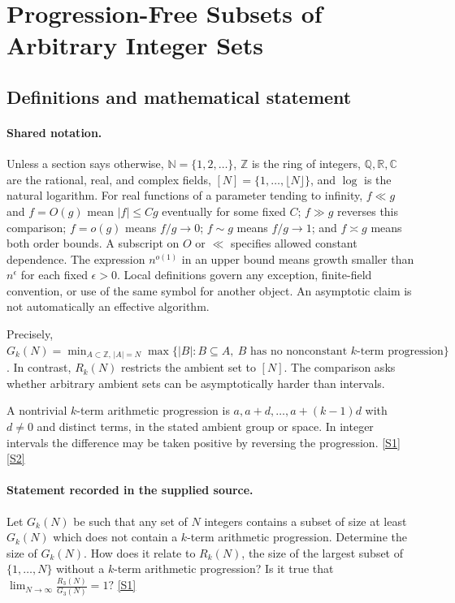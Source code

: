 \documentclass[11pt,a4paper]{article}
\newcommand{\N}{\mathbb{N}}
\newcommand{\Z}{\mathbb{Z}}
\newcommand{\Q}{\mathbb{Q}}
\newcommand{\R}{\mathbb{R}}
\newcommand{\C}{\mathbb{C}}
\newcommand{\sref}[2]{\hyperlink{source:#1:#2}{[S#2]}}
\begin{document}
\section{Progression-Free Subsets of Arbitrary Integer Sets}\label{statement}


\subsection{Definitions and mathematical statement}

\paragraph{Shared notation.}Unless a section says otherwise, $\N=\{1,2,\ldots\}$,
$\Z$ is the ring of integers, $\Q,\R,\C$ are the rational, real, and complex
fields, $[N]=\{1,\ldots,\lfloor N\rfloor\}$, and $\log$ is the natural
logarithm. For real functions of a parameter tending to infinity,
$f\ll g$ and $f=O(g)$ mean $|f|\leq Cg$ eventually for some fixed $C$;
$f\gg g$ reverses this comparison; $f=o(g)$ means $f/g\to0$;
$f\sim g$ means $f/g\to1$; and $f\asymp g$ means both order bounds.
A subscript on $O$ or $\ll$ specifies allowed constant dependence.
The expression $n^{o(1)}$ in an upper bound means growth smaller than
$n^\epsilon$ for each fixed $\epsilon>0$. Local definitions govern any
exception, finite-field convention, or use of the same symbol for another
object. An asymptotic claim is not automatically an effective algorithm.



Precisely, $G_k(N)=\min_{A\subset\Z,\,|A|=N}\max\{|B|:B\subseteq A,\ B\text{ has no nonconstant }k\text{-term progression}\}$. In contrast, $R_k(N)$ restricts the ambient set to $[N]$. The comparison asks whether arbitrary ambient sets can be asymptotically harder than intervals.

A nontrivial $k$-term arithmetic progression is $a,a+d,\ldots,a+(k-1)d$ with $d\ne0$ and distinct terms, in the stated ambient group or space. In integer intervals the difference may be taken positive by reversing the progression. \sref{statement}{1} \sref{statement}{2}

\paragraph{Statement recorded in the supplied source.}
Let $G_k(N)$ be such that any set of $N$ integers contains a subset of size at least $G_k(N)$ which does not contain a $k$-term arithmetic progression. Determine the size of $G_k(N)$. How does it relate to $R_k(N)$, the size of the largest subset of $\{1,\ldots,N\}$ without a $k$-term arithmetic progression? Is it true that $ \lim_{N\to \infty}\frac{R_3(N)}{G_3(N)}=1? $ \sref{statement}{1}
\end{document}
